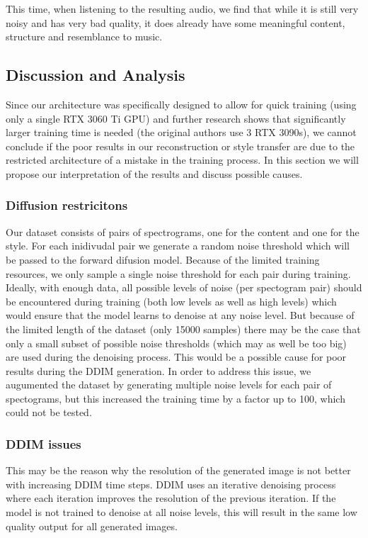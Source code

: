 This time, when listening to the resulting audio, we find that while it is still 
very noisy and has very bad quality, it does already have some meaningful content, structure and resemblance to music.


\subsection{Discussion and Analysis}

Since our architecture was specifically designed to allow for quick training (using only a single RTX 3060 Ti GPU) and further research shows that significantly larger training time is needed (the original authors use 3 RTX 3090s), we cannot conclude if the poor results in our reconstruction or style transfer are due to the restricted architecture of a mistake in the training process. In this section we will propose our interpretation of the results and discuss possible causes.

\subsubsection{Diffusion restricitons}

Our dataset consists of pairs of spectrograms, one for the content and one for the style. For each inidivudal pair we generate a random noise threshold which will be passed to the forward difusion model. Because of the limited training resources, we only sample a single noise threshold for each pair during training. Ideally, with enough data, all possible levels of noise (per spectogram pair) should be encountered during training (both low levels as well as high levels) which would ensure that the model learns to denoise at any noise level. But because of the limited length of the dataset (only 15000 samples) there may be the case that only a small subset of possible noise thresholds (which may as well be too big) are used during the denoising process. This would be a possible cause for poor results during the DDIM generation. In order to address this issue, we augumented the dataset by generating multiple noise levels for each pair of spectograms, but this increased the training time by a factor up to 100, which could not be tested.

\subsubsection{DDIM issues}

This may be the reason why the resolution of the generated image is not better with increasing DDIM time steps. DDIM uses an iterative denoising process where each iteration improves the resolution of the previous iteration. If the model is not trained to denoise at all noise levels, this will result in the same low quality output for all generated images.








